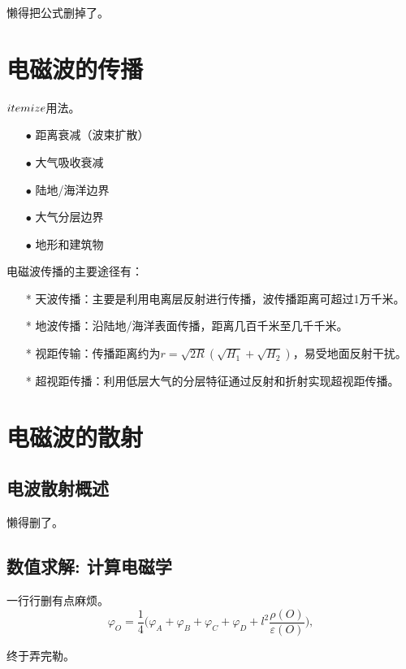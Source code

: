 \documentclass[a4paper,11pt,onecolumn,twoside]{article}
\begin{document}
\begin{multicols}{2}
懒得把公式删掉了。


\section{电磁波的传播}

$\\itemize$用法。

\begin{itemize}
\item[$\bullet$] 距离衰减（波束扩散）
\item[$\bullet$] 大气吸收衰减
\item[$\bullet$] 陆地/海洋边界
\item[$\bullet$] 大气分层边界
\item[$\bullet$] 地形和建筑物
\end{itemize}


电磁波传播的主要途径有：
\begin{itemize}
\item[*] 天波传播：主要是利用电离层反射进行传播，波传播距离可超过1万千米。
\item[*] 地波传播：沿陆地/海洋表面传播，距离几百千米至几千千米。
\item[*] 视距传输：传播距离约为$r = \sqrt{2R} (\sqrt{H_1}+\sqrt{H_2})$，易受地面反射干扰。
\item[*] 超视距传播：利用低层大气的分层特征通过反射和折射实现超视距传播。
\end{itemize}

\section{电磁波的散射}

\subsection{电波散射概述}

懒得删了。

\subsection{数值求解: 计算电磁学}

一行行删有点麻烦。
\begin{equation}
\varphi_O = \frac{1}{4} \big(\varphi_A + \varphi_B + \varphi_C + \varphi_D + l^2\frac{\rho(O)}{\varepsilon(O)} \big),
\end{equation}

终于弄完勒。



\end{multicols}
\end{document}
